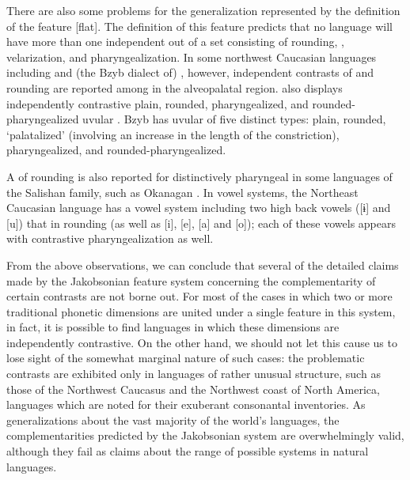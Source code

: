 There are also some problems for the generalization represented by the
definition of the feature [flat]. The definition of this feature
predicts that no language will have more than one independent 
out of a set consisting of rounding, , velarization, and
pharyngealization. In some northwest Caucasian languages
\citep{colarusso88:nwc_phonology} including  and (the Bzyb
dialect of) , however, independent contrasts of  and
rounding are reported among  in the alveopalatal
region.  also displays independently contrastive plain, rounded,
pharyngealized, and rounded-pharyngealized uvular . Bzyb 
has uvular  of five distinct types: plain, rounded,
`palatalized' (involving an increase in the length of the
constriction), pharyngealized, and rounded-pharyngealized.

A  of rounding is also reported for distinctively pharyngeal
 in some languages of the Salishan family, such as Okanagan
\citep{pattison78:okanagan}.  In vowel systems, the Northeast
Caucasian language  \citep{schulze97:tsakhur} has a vowel
system including two high back vowels ([ɨ] and [u]) that  in
rounding (as well as [i], [e], [a] and [o]); each of these vowels
appears with contrastive pharyngealization as well.

From the above observations, we can conclude that several of the
detailed claims made by the Jakobsonian feature system concerning the
complementarity of certain contrasts are not borne out. For most of
the cases in which two or more traditional phonetic dimensions are
united under a single feature in this system, in fact, it is possible
to find languages in which these dimensions are independently
contrastive. On the other hand, we should not let this cause us to
lose sight of the somewhat marginal nature of such cases: the
problematic contrasts are exhibited only in languages of rather
unusual structure, such as those of the Northwest Caucasus and the
Northwest coast of North America, languages which are noted for their
exuberant consonantal inventories. As generalizations about the vast
majority of the world's languages, the complementarities predicted by
the Jakobsonian system are overwhelmingly valid, although they fail as
claims about the range of possible systems in natural languages.

